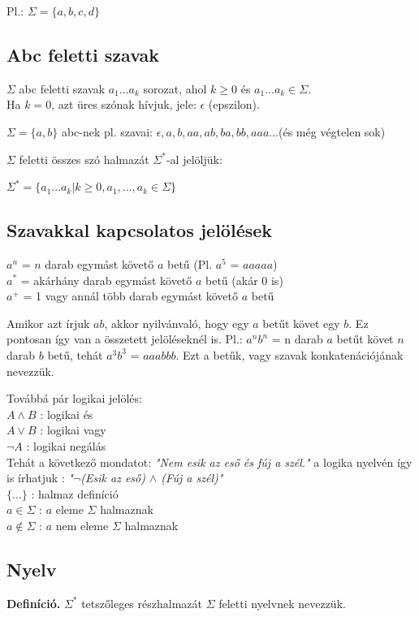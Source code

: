 \documentclass[12pt]{report}
\theoremstyle{definition}
\begin{document}
\begin{center}
Pl.: $\Sigma=\{a,b,c,d\}$
\end{center}
\subsection{Abc feletti szavak}
$\Sigma$ abc feletti szavak $a_1...a_k$ sorozat, ahol $k\geq0$ és  $a_1...a_k\in\Sigma$.\\
Ha $k=0$, azt üres szónak hívjuk, jele: $\epsilon$ (epszilon).
\begin{center}
$\Sigma=\{a,b\}$ abc-nek pl. szavai: $\epsilon,a,b,aa,ab,ba,bb,aaa...$(és még végtelen sok)
\end{center}
$\Sigma$ feletti összes szó halmazát $\Sigma^*$-al jelöljük:
\begin{center}
$\Sigma^* = \{a_1...a_k | k\geq0, a_1,...,a_k\in\Sigma \}$
\end{center}
\subsection{Szavakkal kapcsolatos jelölések}
$a^n$ = $n$ darab egymást követő $a$ betű (Pl. $a^5$ = $aaaaa$)\\
$a^*$ = akárhány darab egymást követő $a$ betű (akár 0 is)\\
$a^+$ = 1 vagy annál több darab egymást követő $a$ betű

Amikor azt írjuk $ab$, akkor nyilvánvaló, hogy egy $a$ betűt követ egy $b$. Ez pontosan így van a összetett jelöléseknél is. Pl.: $a^nb^n$ = n darab $a$ betűt követ $n$ darab $b$ betű, tehát $a^3b^3$ = $aaabbb$. Ezt a betűk, vagy szavak konkatenációjának nevezzük.

Továbbá pár logikai jelölés:\\
$A\land B$ : logikai és\\
$A\lor B$ : logikai vagy\\
$\neg A$ : logikai negálás\\
Tehát a következő mondatot: \textit{"Nem esik az eső és fúj a szél."} a logika nyelvén így is írhatjuk : \textit{"$\neg$(Esik az eső) $\land$ (Fúj a szél)"}\\
$\{...\}$ : halmaz definíció\\
$a\in\Sigma$ : $a$ eleme $\Sigma$ halmaznak\\
$a\notin\Sigma$ : $a$ nem eleme $\Sigma$ halmaznak
\subsection{Nyelv}
\textbf{Definíció.} $\Sigma^*$ tetszőleges részhalmazát $\Sigma$ feletti nyelvnek nevezzük.\\
\end{document}
